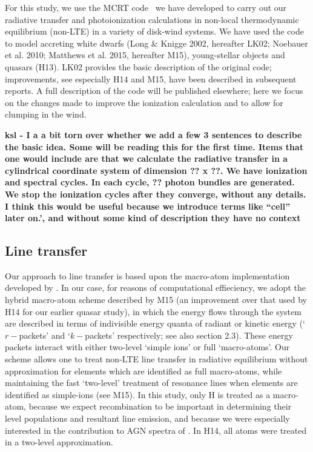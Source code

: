 \documentclass[preprint, a4paper, 11pt]{aastex}
\begin{document}
For this study, we use the MCRT code \py\  we have developed to carry out our radiative transfer and photoionization
calculations in non-local thermodynamic equilibrium (non-LTE) in a variety of disk-wind systems. 
We have used the code  to model accreting white dwarfs 
(Long \& Knigge 2002, hereafter LK02; Noebauer et al. 2010; 
Matthews et al. 2015, hereafter M15), young-stellar objects \citep{simmacro2005}
and quasars (H13).\nocite{noebauer, M15, LK02}  LK02 provides the basic description of the original code; improvements, see especially H14 and M15, have been described in subsequent reports.  A full description of the code will be published elsewhere; here we focus on the changes made to improve the ionization calculation and to allow for clumping in the wind.

{\bf ksl - I a a bit torn over whether we add a few 3 sentences to describe the basic idea.  Some will be reading this for the first time.  Items that one would include are that we calculate the radiative transfer in a cylindrical coordinate system of dimension ?? x ??.  We have ionization and spectral cycles. In each cycle, ?? photon bundles are generated. We stop the ionization cycles after they converge, without any details.  I think this would be useful because we introduce terms like ``cell'' later on.', and without some kind of description they have no context}

\subsection{Line transfer}

Our approach to line transfer is based upon the macro-atom implementation developed by \cite{lucy2002, lucy2003}. In our case, for reasons of computational effieciency, we adopt the  hybrid macro-atom scheme 
described by M15 (an improvement over that used by H14 for our earlier quasar study), 
in which the energy flows
through the system are described in terms of indivisible
energy quanta of radiant or kinetic energy 
(`$r-$packets' and `$k-$packets' respectively; see also section 2.3).
These energy packets interact with either two-level `simple ions'
or full `macro-atoms'. 
Our scheme allows one to treat non-LTE line transfer in radiative equilibrium
without approximation for elements which are identified as 
full macro-atoms, while maintaining the fast `two-level' 
treatment of resonance lines when elements are identified 
as simple-ions (see M15). In this study,
only H is treated as a macro-atom, because 
we expect recombination to be important
in determining their level populations and resultant line emission, and because we were especially interested in the contribution to AGN spectra of \LA.  In H14, all atoms were treated in a two-level approximation.
\end{document}
